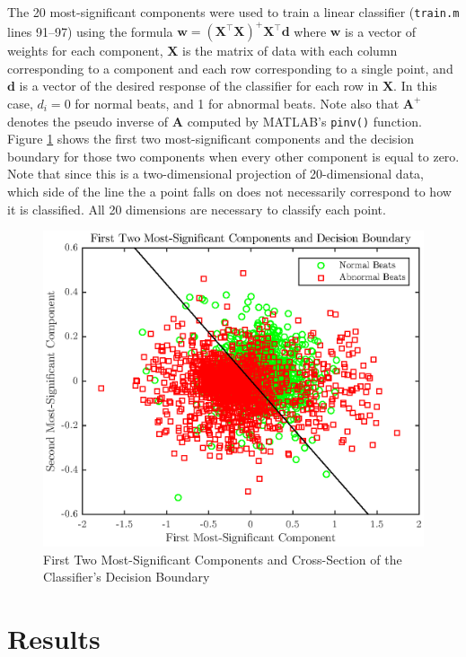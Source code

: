\documentclass[12pt,letter]{article}
\begin{document}
The 20 most-significant components were used to train a linear classifier
(\verb`train.m` lines 91--97) using the formula $\mathbf{w} = (\mathbf{X}^\top
\mathbf{X})^+ \mathbf{X}^\top \mathbf{d}$ where $\mathbf{w}$ is a vector of
weights for each component, $\mathbf{X}$ is the matrix of data with each column
corresponding to a component and each row corresponding to a single point, and
$\mathbf{d}$ is a vector of the desired response of the classifier for each row
in $\mathbf{X}$.  In this case, $d_i = 0$ for normal beats, and 1 for abnormal
beats.  Note also that $\mathbf{A}^+$ denotes the pseudo inverse of $\mathbf{A}$
computed by MATLAB's \verb`pinv()` function.  Figure \ref{fig:classifier} shows
the first two most-significant components and the decision boundary for those
two components when every other component is equal to zero.  Note that since
this is a two-dimensional projection of 20-dimensional data, which side of the
line the a point falls on does not necessarily correspond to how it is
classified.  All 20 dimensions are necessary to classify each point.  

\begin{figure}[hbtp]
    \centering
    \includegraphics[height=0.42\textheight]{../figures/train_05}
    \caption{First Two Most-Significant Components and Cross-Section of the
    Classifier's Decision Boundary}
    \label{fig:classifier}
\end{figure}

\section{Results}
\end{document}
